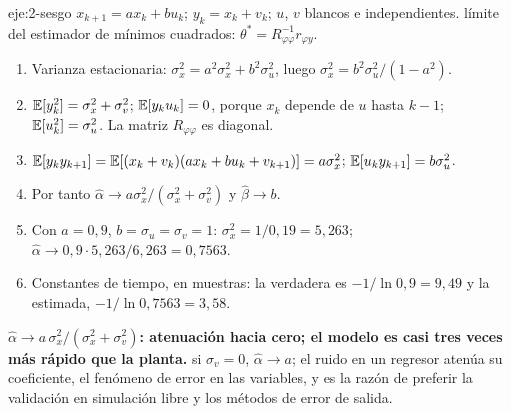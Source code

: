\begin{solucion}{eje:2-sesgo}
\datos $x_{k+1}=ax_k+bu_k$; $y_k=x_k+v_k$; $u$, $v$ blancos e independientes.
\planteamiento límite del estimador de mínimos cuadrados: $\theta^{*}=R_{\varphi\varphi}^{-1}r_{\varphi y}$.
\pasos
\begin{enumerate}[label=\arabic*.]
  \item Varianza estacionaria: $\sigma_x^{2}=a^{2}\sigma_x^{2}+b^{2}\sigma_u^{2}$, luego $\sigma_x^{2}=b^{2}\sigma_u^{2}/(1-a^{2})$.
  \item $\mathbb{E}[y_k^{2}]=\sigma_x^{2}+\sigma_v^{2}$; $\mathbb{E}[y_ku_k]=0$, porque $x_k$ depende de $u$ hasta $k-1$; $\mathbb{E}[u_k^{2}]=\sigma_u^{2}$. La matriz $R_{\varphi\varphi}$ es diagonal.
  \item $\mathbb{E}[y_ky_{k+1}]=\mathbb{E}[(x_k+v_k)(ax_k+bu_k+v_{k+1})]=a\sigma_x^{2}$; $\mathbb{E}[u_ky_{k+1}]=b\sigma_u^{2}$.
  \item Por tanto $\hat\alpha\to a\sigma_x^{2}/(\sigma_x^{2}+\sigma_v^{2})$ y $\hat\beta\to b$.
  \item Con $a=0{,}9$, $b=\sigma_u=\sigma_v=1$: $\sigma_x^{2}=1/0{,}19=5{,}263$; $\hat\alpha\to0{,}9\cdot5{,}263/6{,}263=0{,}7563$.
  \item Constantes de tiempo, en muestras: la verdadera es $-1/\ln0{,}9=9{,}49$ y la estimada, $-1/\ln0{,}7563=3{,}58$.
\end{enumerate}
\resultado \textbf{$\hat\alpha\to a\,\sigma_x^{2}/(\sigma_x^{2}+\sigma_v^{2})$: atenuación hacia cero; el modelo es casi tres veces más rápido que la planta.}
\comprobacion si $\sigma_v=0$, $\hat\alpha\to a$; el ruido en un regresor atenúa su coeficiente, el fenómeno de error en las variables, y es la razón de preferir la validación en simulación libre y los métodos de error de salida.
\end{solucion}

